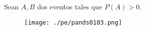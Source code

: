 %
%
% 
%
%
%
% 
%
%
% 
%
% 
%
% 
%
{}
Sean $A,B$ dos eventos tales que $P(A)>0.$
\begin{figure}[h]
 \centering
 \texttt{[image: ./pe/pands0103.png]}
 \label{pands0103}
\end{figure}

